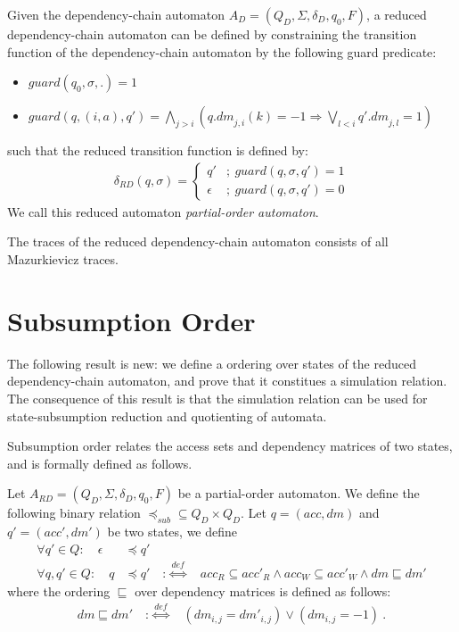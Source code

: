 \documentclass[envcountsame]{llncs}%
\begin{document}
\begin{definition}
\label{def:rautomaton}
%
  Given the dependency-chain automaton $A_D=(Q_D,\Sigma,\delta_D,q_0,F)$,
  a reduced dependency-chain automaton can be defined by constraining the
  transition function of the dependency-chain automaton by the following
  guard predicate:
%
    \begin{itemize}
      \item $guard(q_0,\sigma,.)=1$
      \item $guard(q, (i,a), q')=\bigwedge_{j>i}  ( {q.dm}_{j,i}(k)= -1 \Longrightarrow \bigvee_{l<i} {{q'}.dm}_{j,l}=1)$
    \end{itemize}
%
  such that the reduced transition function is defined by:
%
    \begin{align*}
      \delta_{RD}(q, \sigma) =
        \begin{cases}
          q' & ; \ guard(q,\sigma,q')=1\\
          \epsilon & ; \ guard(q,\sigma,q')=0
        \end{cases}
    \end{align*}
%
We call this reduced automaton \emph{partial-order automaton}.
\end{definition}

\begin{lemma}
  The traces of the reduced dependency-chain automaton consists of
  all Mazurkievicz traces.
\end{lemma}

\section{Subsumption Order}
%
The following result is new: we define a ordering over states of the reduced dependency-chain automaton,
and prove that it constitues a simulation relation.
%
The consequence of this result is that the simulation relation can be used for state-subsumption reduction
and quotienting of automata.

Subsumption order relates the access sets and dependency matrices of two states,
and is formally defined as follows.

\begin{definition}
Let $A_{RD}=(Q_D,\Sigma,\delta_D,q_0,F)$ be a partial-order automaton.
We define the following binary relation $\preceq_{sub} \subseteq Q_D \times Q_D$.
Let $q=(acc, dm)$ and $q'=(acc', dm')$ be two states,
we define
\begin{align*}
\forall q'\in Q:\quad \epsilon &\preceq q' \\
\forall q,q'\in Q:\quad q &\preceq q' \quad :\overset{def}{\Longleftrightarrow} \quad acc_R \subseteq acc'_R \wedge acc_W \subseteq acc'_W \wedge dm \sqsubseteq dm'
\end{align*}
where the ordering $\sqsubseteq$ over dependency matrices is defined as follows:
\begin{align*}
dm \sqsubseteq dm' \quad :\overset{def}{\Longleftrightarrow} \quad \left (dm_{i,j}={dm'}_{i,j}\right) \vee \left (dm_{i,j}=-1 \right) \ .
\end{align*}

\end{definition}
\end{document}
